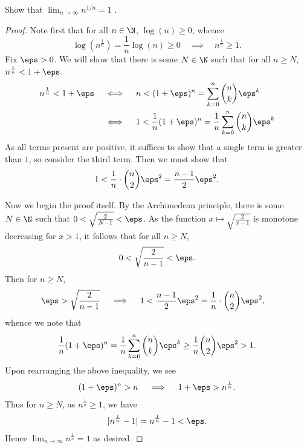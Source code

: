 \documentclass[12pt]{article}
\begin{document}
\begin{homeworkProblem}
 Show that $ \lim_{n\to \infty} n^{1/n}  = 1$ .

\begin{proof}
Note first that for all $ n\in\N $, $ \log(n) \geq 0 $, whence 
\[
  \log(n^{\frac{1}{n}}) = \frac{1}{n}\log(n) \geq 0  \quad \implies \quad n^{\frac{1}{n}} \geq 1.
\]
Fix $ \eps > 0$. We will show that there is some $ N\in \N $ such that for all $ n\geq N $, $ n^{\frac{1}{n}} < 1 + \eps$.
\begin{align*}
  n^\frac{1}{n} < 1+ \eps\quad &\iff\quad n< (1+\eps)^{n} = \sum_{k=0}^{n} \binom{n}{k} \eps^{k}\\
  &\iff\quad 1< \frac{1}{n}(1+\eps)^{n} = \frac{1}{n}\sum_{k=0}^{n} \binom{n}{k} \eps^{k}
\end{align*}
As all terms present are positive, it suffices to show that a single term is greater than $ 1 $, so consider the third term. Then we must show that 
\begin{align*}
  1 < \frac{1}{n}\cdot\binom{n}{2} \eps^{2} = \frac{n-1}{2} \eps^{2}.
\end{align*}

Now we begin the proof itself. By the Archimedean principle, there is some $ N\in \N $ such that $ 0< \sqrt{\frac{2}{N-1}} < \eps $. As the function $ x\mapsto \sqrt{\frac{2}{x-1}} $ is monotone decreasing for $ x>1 $, it follows that for all $ n\geq N $, 
\[
  0 < \sqrt{\frac{2}{n-1}} < \eps.
\]
Then for $ n\geq N $, 
\begin{align*}
  \eps > \sqrt{\frac{2}{n-1}} \quad &\implies \quad 1 <  \frac{n-1}{2} \eps^{2}= \frac{1}{n}\cdot \binom{n}{2} \eps^{2},
\end{align*}
whence we note that
\begin{align*}
  \frac{1}{n}(1+\eps)^{n} = \frac{1}{n}\sum_{k=0}^{n} \binom{n}{k} \eps^{k} \geq \frac{1}{n} \binom{n}{2} \eps^{2} > 1.
\end{align*}
Upon rearranging the above inequality, we see
\begin{align*}
  (1+\eps)^{n} > n \quad \implies \quad 1+\eps > n^{\frac{1}{n}}.
\end{align*}
Thus for $ n\geq N $, as $ n^{\frac{1}{n}}\geq 1 $, we have
\begin{align*}
  |n^{\frac{1}{n}}-1| = n^{\frac{1}{n}}-1 < \eps.
\end{align*}
Hence $ \lim_{n\to \infty}n^{\frac{1}{n}} = 1 $ as desired.
\end{proof}
\end{homeworkProblem}
\end{document}
